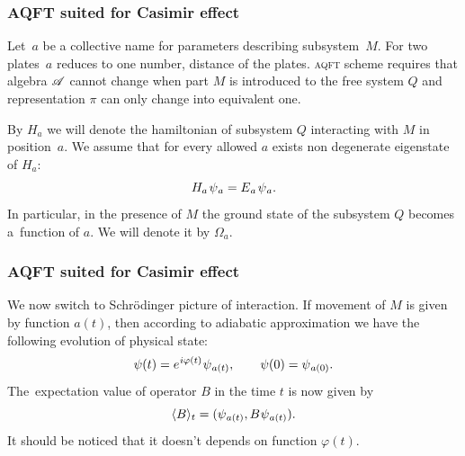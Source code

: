 \documentclass[10pt,t]{beamer}
\begin{document}
\begin{frame}
  \frametitle{AQFT suited for Casimir effect}


  Let~$a$ be a collective name for parameters describing subsystem~$M$.
  For two plates~$a$ reduces to one number, distance of the plates.
  \textsc{aqft} scheme requires that algebra $\mathcal{A}$ cannot change when
  part $M$ is introduced to the free system $Q$ and representation $\pi$
  can only change into equivalent one.

  By $H_{ a }$ we will denote the hamiltonian of subsystem $Q$ interacting
  with $M$ in position~$a$. We assume that for every allowed $a$ exists
  non degenerate eigenstate of $H_{ a }$:
  \begin{equation}
    \label{eq:Overview-of-Herdegens-approach-ETC-03}
    H_{ a } \hspace{0.11em} \psi_{ \hspace{0.05em} a } =
    E_{ \hspace{0.05em} a } \hspace{0.11em} \psi_{ \hspace{0.05em} a }.
  \end{equation}
  In particular, in the presence of $M$ the ground state of the subsystem
  $Q$ becomes a~function of $a$. We will denote it by $\Omega_{ a }$.

\end{frame}





\begin{frame}
  \frametitle{AQFT suited for Casimir effect}


  We now switch to Schr\"{o}dinger picture of interaction. If movement of
  $M$ is given by function $a( t )$, then according to adiabatic
  approximation we have the following evolution of physical state:
  \begin{equation}
    \label{eq:Overview-of-Herdegens-approach-ETC-04}
    \psi( t ) =
    e^{ \hspace{0.05em} i \varphi( t ) } \hspace{0.05em} \psi_{ \hspace{0.05em} a( t ) }, \qquad
    \psi( 0 ) = \psi_{ \hspace{0.05em} a( 0 ) }.
  \end{equation}
  The~expectation value of operator $B$ in the time $t$ is now given by
  \begin{equation}
    \label{eq:Overview-of-Herdegens-approach-ETC-05}
    \langle B \rangle_{ t } =
    ( \psi_{ \hspace{0.05em} a( t ) }, B \hspace{0.05em} \psi_{ \hspace{0.05em} a( t ) } ).
  \end{equation}
  It should be noticed that it doesn't depends on function $\varphi( t )$.

\end{frame}
\end{document}

